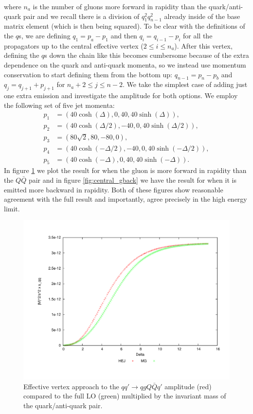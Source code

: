 where $n_a$ is the number of gluons more forward in rapidity than the quark/anti-quark pair and we recall there is a division of $q_1^2 q_{n-1}^2$ already inside of the base matrix element (which is then being squared). To be clear with the definitions of the $q$s, we are defining $q_1 = p_a - p_1$ and then $q_i = q_{i-1}-p_i$ for all the propagators up to the central effective vertex ($2 \leq i \leq n_a$). After this vertex, defining the $q$s down the chain like this becomes cumbersome because of the extra dependence on the quark and anti-quark momenta, so we instead use momentum conservation to start defining them from the bottom up:  $q_{n-1} = p_n-p_b$ and $q_{j} = q_{j+1} + p_{j+1}$ for $n_a+2 \leq j \leq n-2$. We take the simplest case of adding just one extra emission and investigate the amplitude for both options. We employ the following set of five jet momenta:
\begin{equation}
\begin{split}
p_1 & = (40 \cosh(\Delta), 0, 40, 40 \sinh(\Delta)), \\
p_2 & = (40 \cosh(\Delta/2), -40, 0, 40 \sinh(\Delta/2)), \\
p_3 & = (80 \sqrt{2}, 80, -80, 0), \\
p_4 & = (40 \cosh(-\Delta/2), -40, 0, 40 \sinh(-\Delta/2)), \\
p_5 & = (40 \cosh(-\Delta), 0, 40, 40 \sinh(-\Delta)). 
\end{split}
\end{equation}
In figure \ref{fig:central_gfor} we plot the result for when the gluon is more forward in rapidity than the $Q\bar{Q}$ pair and in figure \ref{fig:central_gback} we have the result for when it is emitted more backward in rapidity. Both of these figures show reasonable agreement with the full result and importantly, agree precisely in the high energy limit. 

\begin{figure}[H]
\centering
\includegraphics[scale=0.44]{Images/qQ_qgqqxQ_sqq.pdf}
\caption{Effective vertex approach to the $qq' \to qgQ\bar{Q}q'$ amplitude (red) compared to the full LO (green) multiplied by the invariant mass of the quark/anti-quark pair.}
\label{fig:central_gfor}
\end{figure}

